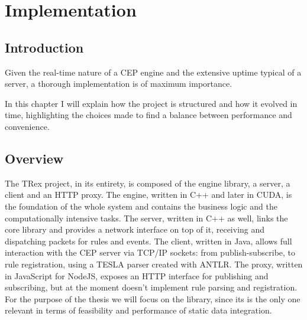 \chapter{Implementation}

\section{Introduction}
Given the real-time nature of a CEP engine and the extensive uptime typical of a server, a thorough implementation is of maximum importance.

In this chapter I will explain how the project is structured and how it evolved in time, highlighting the choices made to find a balance between performance and convenience.

\section{Overview}
The TRex project, in its entirety, is composed of the engine library, a server, a client and an HTTP proxy. The engine, written in C++ and later in CUDA, is the foundation of the whole system and contains the business logic and the computationally intensive tasks. The server, written in C++ as well, links the core library and provides a network interface on top of it, receiving and dispatching packets for rules and events. The client, written in Java, allows full interaction with the CEP server via TCP/IP sockets: from publish-subscribe, to rule registration, using a TESLA parser created with ANTLR. The proxy, written in JavaScript for NodeJS, exposes an HTTP interface for publishing and subscribing, but at the moment doesn't implement rule parsing and registration. For the purpose of the thesis we will focus on the library, since its is the only one relevant in terms of feasibility and performance of static data integration.


